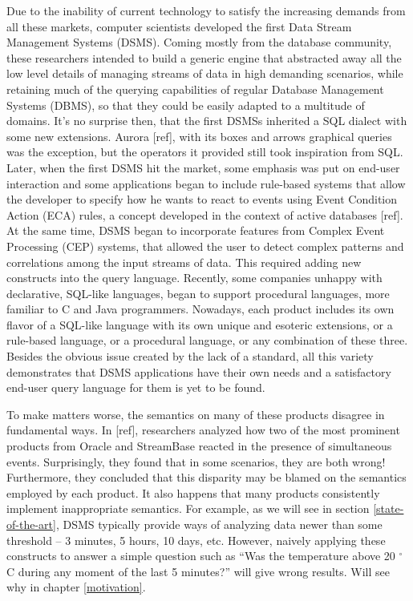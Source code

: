 \documentclass{report}
\begin{document}
Due to the inability of current technology to satisfy the increasing
demands from all these markets, computer scientists developed the
first Data Stream Management Systems (DSMS). Coming mostly from the
database community, these researchers intended to build a generic
engine that abstracted away all the low level details of managing
streams of data in high demanding scenarios, while retaining much of
the querying capabilities of regular Database Management Systems
(DBMS), so that they could be easily adapted to a multitude of
domains. It's no surprise then, that the first DSMSs inherited a SQL
dialect with some new extensions. Aurora [ref], with its boxes and
arrows graphical queries was the exception, but the operators it
provided still took inspiration from SQL. Later, when the first DSMS
hit the market, some emphasis was put on end-user interaction and some
applications began to include rule-based systems that allow the
developer to specify how he wants to react to events using Event
Condition Action (ECA) rules, a concept developed in the context of
active databases [ref]. At the same time, DSMS began to incorporate
features from Complex Event Processing (CEP) systems, that allowed the
user to detect complex patterns and correlations among the input
streams of data. This required adding new constructs into the query
language. Recently, some companies unhappy with declarative, SQL-like
languages, began to support procedural languages, more familiar to C
and Java programmers. Nowadays, each product includes its own flavor
of a SQL-like language with its own unique and esoteric extensions, or
a rule-based language, or a procedural language, or any combination of
these three. Besides the obvious issue created by the lack of a
standard, all this variety demonstrates that DSMS applications have
their own needs and a satisfactory end-user query language for them is
yet to be found.

To make matters worse, the semantics on many of these products
disagree in fundamental ways. In [ref], researchers analyzed how two
of the most prominent products from Oracle and StreamBase reacted in
the presence of simultaneous events. Surprisingly, they found that in
some scenarios, they are both wrong! Furthermore, they concluded that
this disparity may be blamed on the semantics employed by each
product. It also happens that many products consistently implement
inappropriate semantics. For example, as we will see in section
\ref{state-of-the-art}, DSMS typically provide ways of analyzing data
newer than some threshold -- 3 minutes, 5 hours, 10 days,
etc. However, naively applying these constructs to answer a simple
question such as ``Was the temperature above 20 $^{\circ}$C during any
moment of the last 5 minutes?'' will give wrong results. Will see why
in chapter \ref{motivation}.
\end{document}
